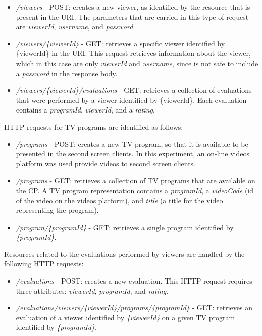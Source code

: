 \documentclass[journal]{IEEEtran}
\begin{document}
\begin{itemize}
	\item \emph{/viewers} - POST: creates a new viewer, as identified by the resource that is present in the URI. The parameters that are carried in this type of request are \emph{viewerId}, \emph{username}, and \emph{password}.
	\item \emph{/viewers/\{viewerId\}} - GET: retrieves a specific viewer identified by \{viewerId\} in the URI. This request retrieves information about the viewer, which in this case are only \emph{viewerId} and \emph{username}, since is not safe to include a \emph{password} in the response body.
	\item \emph{/viewers/\{viewerId\}/evaluations} - GET: retrieves a collection of evaluations that were performed by a viewer identified by \{viewerId\}. Each evaluation contains a \emph{programId}, \emph{viewerId}, and a \emph{rating}.
\end{itemize}

HTTP requests for TV programs are identified as follows:

\begin{itemize}
	\item \emph{/programs} - POST: creates a new TV program, so that it is available to be presented in the second screen clients. In this experiment, an on-line videos platform was used provide videos to second screen clients. 
	\item \emph{/programs} - GET: retrieves a collection of TV programs that are available on the CP. A TV program representation contains a \emph{programId}, a \emph{videoCode} (id of the video on the videos platform), and \emph{title} (a title for the video representing the program).
	\item \emph{/program/\{programId\}} - GET: retrieves a single program identified by \emph{\{programId\}}.
\end{itemize}

Resources related to the evaluations performed by viewers are handled by the following HTTP requests:

\begin{itemize}
	\item \emph{/evaluations} - POST: creates a new evaluation. This HTTP request requires three attributes: \emph{viewerId}, \emph{programId}, and \emph{rating}.
	\item \emph{/evaluations/viewers/\{viewerId\}/programs/\{programId\}} - GET: retrieves an evaluation of a viewer identified by \emph{\{viewerId\}} on a given TV program identified by \emph{\{programId\}}.
\end{itemize}
\end{document}
